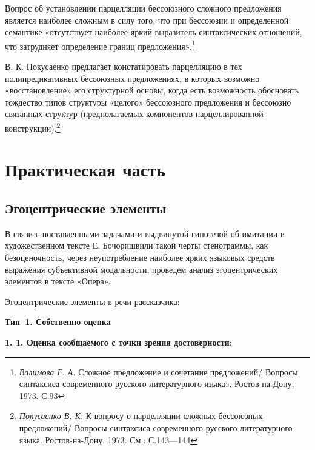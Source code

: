 \documentclass{kursa4}
\begin{document}
      {Вопрос об установлении парцелляции бессоюзного
      сложного предложения является наиболее сложным в силу того, что при
      бессоюзии и определенной семантике «отсутствует наиболее яркий
      выразитель синтаксических отношений, что затрудняет определение границ
      предложения».}\footnote{{
      }\textit{{Валимова Г. А. }}{Сложное
      предложение и сочетание предложений/ Вопросы синтаксиса современного
      русского литературного языка». Ростов-на-Дону, 1973. С.93}}

      {В. К. Покусаенко предлагает констатировать
      парцелляцию в тех полипредикативных бессоюзных предложениях, в которых
      возможно «восстановление» его структурной основы, когда есть
      возможность обосновать тождество типов структуры «целого» бессоюзного
      предложения и бессоюзно связанных структур (предполагаемых компонентов
      парцеллированной конструкции).}\footnote{{
      }\textit{{Покусаенко В. К. }}{К
      вопросу о парцелляции сложных бессоюзных предложений/ Вопросы
      синтаксиса современного русского литературного языка. Ростов-на-Дону,
      1973. См.: С.143—144}}

  \chapter{Практическая часть}

    \section{Эгоцентрические элементы}

    {В связи с поставленными задачами и выдвинутой
    гипотезой об имитации в художественном тексте Е. Бочоришвили такой
    черты стенограммы, как безоценочность, через неупотребление наиболее
    ярких языковых средств выражения субъективной модальности, проведем
    анализ эгоцентрических элементов в тексте «Опера». }

    {}{Эгоцентрические элементы в речи
    рассказчика:}

    {}\textbf{ Тип~1. Собственно оценка}

    \textbf{{1. 1. О}}\textbf{ценка сообщаемого с точки
    зрения достоверности}:
\end{document}
